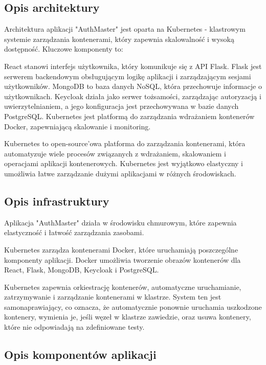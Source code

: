 \documentclass[12pt,a4paper]{article}
\begin{document}
\subsection{Opis architektury}
\label{sec:introduction}
Architektura aplikacji "AuthMaster" jest oparta na Kubernetes - klastrowym systemie zarządzania kontenerami, który zapewnia skalowalność i wysoką dostępność. Kluczowe komponenty to:

React stanowi interfejs użytkownika, który komunikuje się z API Flask. Flask jest serwerem backendowym obsługującym logikę aplikacji i zarządzającym sesjami użytkowników. MongoDB to baza danych NoSQL, która przechowuje informacje o użytkownikach. Keycloak działa jako serwer tożsamości, zarządzając autoryzacją i uwierzytelnianiem, a jego konfiguracja jest przechowywana w bazie danych PostgreSQL. Kubernetes jest platformą do zarządzania wdrażaniem kontenerów Docker, zapewniającą skalowanie i monitoring.

Kubernetes to open-source'owa platforma do zarządzania kontenerami, która automatyzuje wiele procesów związanych z wdrażaniem, skalowaniem i operacjami aplikacji kontenerowych. Kubernetes jest wyjątkowo elastyczny i umożliwia łatwe zarządzanie dużymi aplikacjami w różnych środowiskach.


\subsection{Opis infrastruktury}
\label{sec:Users}

Aplikacja "AuthMaster" działa w środowisku chmurowym, które zapewnia elastyczność i łatwość zarządzania zasobami. 

Kubernetes zarządza kontenerami Docker, które uruchamiają poszczególne komponenty aplikacji. Docker umożliwia tworzenie obrazów kontenerów dla React, Flask, MongoDB, Keycloak i PostgreSQL.

Kubernetes zapewnia orkiestrację kontenerów, automatyczne uruchamianie, zatrzymywanie i zarządzanie kontenerami w klastrze. System ten jest samonaprawiający, co oznacza, że automatycznie ponownie uruchamia uszkodzone kontenery, wymienia je, jeśli węzeł w klastrze zawiedzie, oraz usuwa kontenery, które nie odpowiadają na zdefiniowane testy.

\subsection{Opis komponentów aplikacji}
\label{sec:FunctionalConditions}
\end{document}
